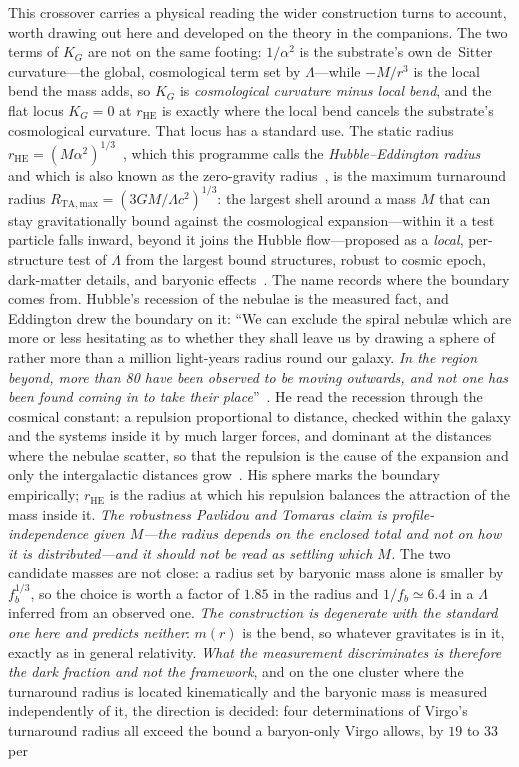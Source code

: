 \documentclass[11pt,a4paper]{article}
\theoremstyle{definition}
\begin{document}
This crossover carries a physical reading the wider construction turns to account, worth drawing out here and developed on the theory in the companions. The two terms of $K_{G}$ are not on the same footing: $1/\alpha^{2}$ is the substrate's own de~Sitter curvature---the global, cosmological term set by $\Lambda$---while $-M/r^{3}$ is the local bend the mass adds, so $K_{G}$ is \emph{cosmological curvature minus local bend}, and the flat locus $K_{G}=0$ at $r_{\mathrm{HE}}$ is exactly where the local bend cancels the substrate's cosmological curvature. That locus has a standard use. The static radius $r_{\mathrm{HE}}=(M\alpha^{2})^{1/3}$~\cite{StuchlikHledik1999}, which this programme calls the \emph{Hubble--Eddington radius}~\cite{Eddington1933} and which is also known as the zero-gravity radius~\cite{Chernin2001}, is the maximum turnaround radius $R_{\mathrm{TA,max}}=(3GM/\Lambda c^{2})^{1/3}$: the largest shell around a mass $M$ that can stay gravitationally bound against the cosmological expansion---within it a test particle falls inward, beyond it joins the Hubble flow---proposed as a \emph{local}, per-structure test of $\Lambda$ from the largest bound structures, robust to cosmic epoch, dark-matter details, and baryonic effects~\cite{PavlidouTomaras2014}. The name records where the boundary comes from. Hubble's recession of the nebulae is the measured fact, and Eddington drew the boundary on it: ``We can exclude the spiral nebul\ae{} which are more or less hesitating as to whether they shall leave us by drawing a sphere of rather more than a million light-years radius round our galaxy. \emph{In the region beyond, more than 80 have been observed to be moving outwards, and not one has been found coming in to take their place}''~\cite[ch.~II]{Eddington1933}. He read the recession through the cosmical constant: a repulsion proportional to distance, checked within the galaxy and the systems inside it by much larger forces, and dominant at the distances where the nebulae scatter, so that the repulsion is the cause of the expansion and only the intergalactic distances grow~\cite[ch.~I]{Eddington1933}. His sphere marks the boundary empirically; $r_{\mathrm{HE}}$ is the radius at which his repulsion balances the attraction of the mass inside it. \emph{The robustness Pavlidou and Tomaras claim is profile-independence \emph{given} $M$---the radius depends on the enclosed total and not on how it is distributed---and it should not be read as settling \emph{which} $M$.} The two candidate masses are not close: a radius set by baryonic mass alone is smaller by $f_{b}^{1/3}$, so the choice is worth a factor of $1.85$ in the radius and $1/f_{b}\simeq6.4$ in a $\Lambda$ inferred from an observed one. \emph{The construction is degenerate with the standard one here and predicts neither}: $m(r)$ is the bend, so whatever gravitates is in it, exactly as in general relativity. \emph{What the measurement discriminates is therefore the dark fraction and not the framework}, and on the one cluster where the turnaround radius is located kinematically and the baryonic mass is measured independently of it, the direction is decided: four determinations of Virgo's turnaround radius all exceed the bound a baryon-only Virgo allows, by $19$ to $33$ per 
\end{document}
